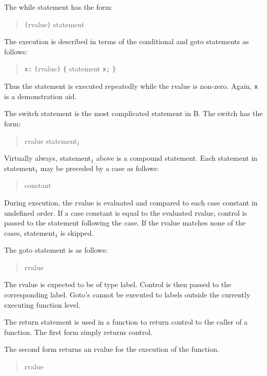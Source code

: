 \documentclass[12pt]{report}
\begin{document}

The while statement has the form:
\begin{quote}
  \verb|(|rvalue\verb|)| statement
\end{quote}
The execution is described in terms of the conditional and goto
statements as follows:
\begin{quote}
  \verb|x:| \verb|(|rvalue\verb|)| \verb|{| statement  \verb|x;| \verb|}|
\end{quote}
Thus the statement is executed repeatedly while the rvalue is
non-zero. Again, \verb|x| is a demonstration aid.


The switch statement is the most complicated statement in B. The
switch has the form:
\begin{quote}
   rvalue statement$_1$
\end{quote}
Virtually always, statement$_1$ above is a compound statement. Each
statement in statement$_1$ may be preceded by a case as follows:
\begin{quote}
   constant \token{:}
\end{quote}
During execution, the rvalue is evaluated and compared to each case
constant in undefined order. If a case constant is equal to the
evaluated rvalue, control is passed to the statement following the
case. If the rvalue matches none of the cases, statement$_1$ is skipped.


The goto statement is as follows:
\begin{quote}
   rvalue \token{;}
\end{quote}

The rvalue is expected to be of type label. Control is then passed to
the corresponding label. Goto's cannot be executed to labels outside
the currently executing function level.


The return statement is used in a function to return control to the
caller of a function. The first form simply returns control.
\begin{quote}
   \token{;}
\end{quote}

The second form returns an rvalue for the execution of the function.
\begin{quote}
   \token{(} rvalue \token{)} \token{;}
\end{quote}
\end{document}
